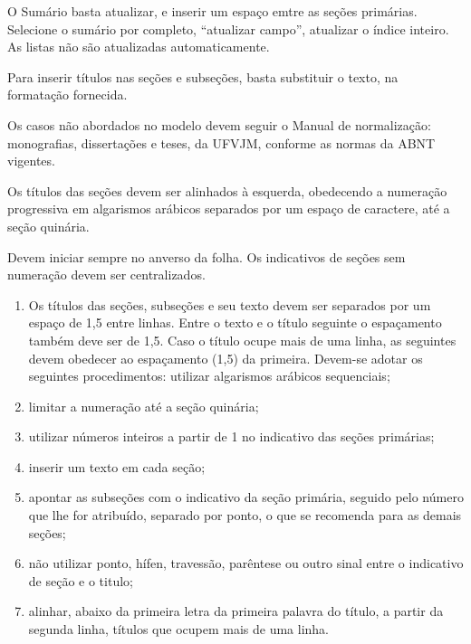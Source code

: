 \documentclass[
	12pt,				%
	openright,			%
	twoside,			%
	a4paper,			%
	chapter=TITLE,		%
	sumario=abnt-6027-2012,
	english,			%
	brazil				%
	]{UFVJM-abntex2}
\begin{document}
O Sumário basta atualizar, e inserir um espaço emtre as seções primárias. Selecione o sumário por completo, “atualizar campo”, atualizar o índice inteiro.
As listas não são atualizadas automaticamente.

Para inserir títulos nas seções e subseções, basta substituir o texto, na formatação fornecida.

Os casos não abordados no modelo devem seguir o Manual de normalização: monografias, dissertações e teses, da UFVJM, conforme as normas da ABNT vigentes.

Os títulos  das seções devem ser alinhados à esquerda, obedecendo a numeração progressiva em algarismos arábicos separados por um espaço de caractere, até a seção quinária. 

Devem iniciar sempre no anverso da folha. Os indicativos de seções sem numeração devem ser centralizados.

\begin{enumerate}
\item Os títulos das seções, subseções e seu texto devem ser separados por um espaço de 1,5 entre linhas. Entre o texto e o título seguinte o espaçamento também deve ser de 1,5. Caso o título ocupe mais de uma linha, as seguintes devem obedecer ao espaçamento (1,5) da primeira. Devem-se adotar os seguintes procedimentos: utilizar algarismos arábicos sequenciais;
\item limitar a numeração até a seção quinária;
\item utilizar números inteiros a partir de 1 no indicativo das seções primárias;
\item inserir um texto em cada seção;
\item apontar as subseções com o indicativo da seção primária, seguido pelo número que lhe for atribuído, separado por ponto, o que  se recomenda para as demais seções;
\item não utilizar ponto, hífen, travessão, parêntese ou outro sinal entre o indicativo de seção e o titulo;
\item alinhar, abaixo da primeira letra da primeira palavra do título, a partir da segunda linha, títulos que ocupem mais de uma linha. 
\end{enumerate}
\end{document}
